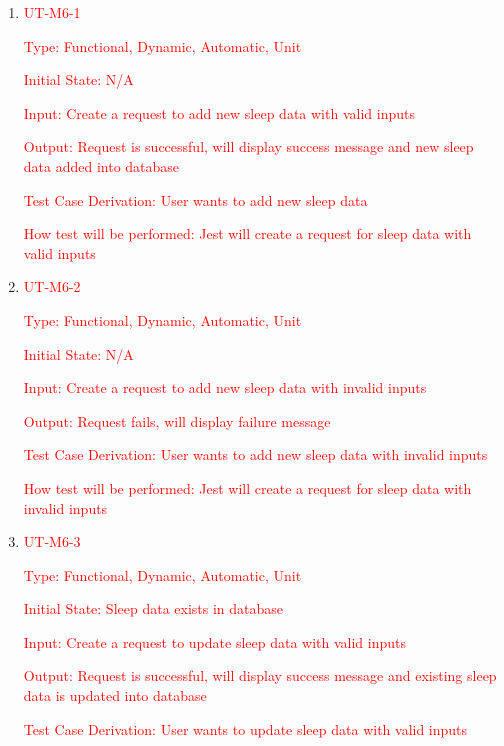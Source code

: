 \documentclass[12pt, titlepage]{article}
\begin{document}
\begin{enumerate}

	\item{\textcolor{red}{UT-M6-1\\}}

	\textcolor{red}{Type: Functional, Dynamic, Automatic, Unit}

	\textcolor{red}{Initial State: N/A}

	\textcolor{red}{Input: Create a request to add new sleep data with valid inputs}

	\textcolor{red}{Output: Request is successful, will display success message and new sleep data added into database}

	\textcolor{red}{Test Case Derivation: User wants to add new sleep data}

	\textcolor{red}{How test will be performed: Jest will create a request for sleep data with valid inputs}

	\item{\textcolor{red}{UT-M6-2\\}}

	\textcolor{red}{Type: Functional, Dynamic, Automatic, Unit}

	\textcolor{red}{Initial State: N/A}

	\textcolor{red}{Input: Create a request to add new sleep data with invalid inputs}

	\textcolor{red}{Output: Request fails, will display failure message}

	\textcolor{red}{Test Case Derivation: User wants to add new sleep data with invalid inputs}

	\textcolor{red}{How test will be performed: Jest will create a request for sleep data with invalid inputs}

        \item{\textcolor{red}{UT-M6-3\\}}

	\textcolor{red}{Type: Functional, Dynamic, Automatic, Unit}

	\textcolor{red}{Initial State: Sleep data exists in database}

	\textcolor{red}{Input: Create a request to update sleep data with valid inputs}

	\textcolor{red}{Output: Request is successful, will display success message and existing sleep data is updated into database}

	\textcolor{red}{Test Case Derivation: User wants to update sleep data with valid inputs}


\end{enumerate}
\end{document}
